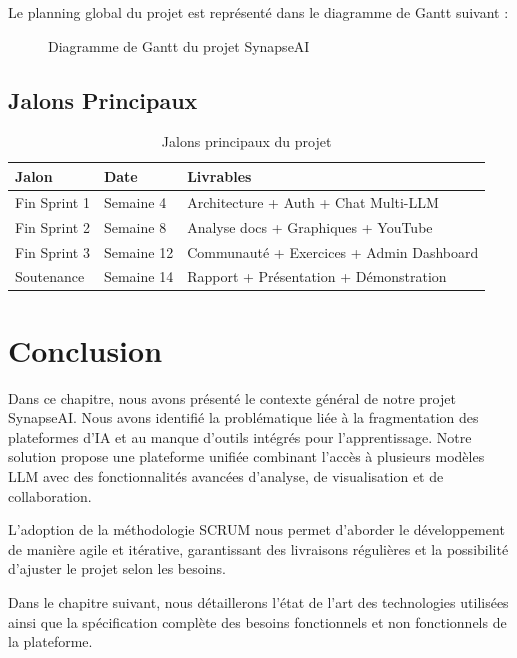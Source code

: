 Le planning global du projet est représenté dans le diagramme de Gantt suivant :

\begin{figure}[H]
    \centering
    \caption{Diagramme de Gantt du projet SynapseAI}
    \label{fig:gantt}
\end{figure}

\subsection{Jalons Principaux}

\begin{table}[H]
\centering
\caption{Jalons principaux du projet}
\label{tab:jalons}
\begin{tabular}{|l|l|p{6cm}|}
\hline
\textbf{Jalon} & \textbf{Date} & \textbf{Livrables} \\
\hline
Fin Sprint 1 & Semaine 4 & Architecture + Auth + Chat Multi-LLM \\
\hline
Fin Sprint 2 & Semaine 8 & Analyse docs + Graphiques + YouTube \\
\hline
Fin Sprint 3 & Semaine 12 & Communauté + Exercices + Admin Dashboard \\
\hline
Soutenance & Semaine 14 & Rapport + Présentation + Démonstration \\
\hline
\end{tabular}
\end{table}

\section{Conclusion}

Dans ce chapitre, nous avons présenté le contexte général de notre projet SynapseAI. Nous avons identifié la problématique liée à la fragmentation des plateformes d'IA et au manque d'outils intégrés pour l'apprentissage. Notre solution propose une plateforme unifiée combinant l'accès à plusieurs modèles LLM avec des fonctionnalités avancées d'analyse, de visualisation et de collaboration.

L'adoption de la méthodologie SCRUM nous permet d'aborder le développement de manière agile et itérative, garantissant des livraisons régulières et la possibilité d'ajuster le projet selon les besoins.

Dans le chapitre suivant, nous détaillerons l'état de l'art des technologies utilisées ainsi que la spécification complète des besoins fonctionnels et non fonctionnels de la plateforme.

